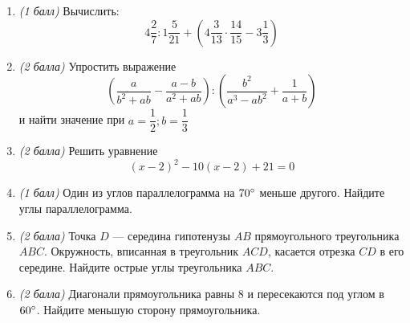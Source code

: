 \documentclass[12pt, a4paper]{article}
\begin{document}
		

\begin{enumerate}
	\item \textit{(1 балл)} Вычислить: $$4\dfrac{2}{7}:1\dfrac{5}{21}+\left(4\dfrac{3}{13}\cdot\dfrac{14}{15}-3\dfrac{1}{3}\right)$$
	\item \textit{(2 балла)} Упростить выражение $$\left(\dfrac{a}{b^2+ab}-\dfrac{a-b}{a^2+ab}\right):\left(\dfrac{b^2}{a^3-ab^2}+\dfrac{1}{a+b}\right)$$
	и найти значение при $a=\dfrac{1}{2}; b=\dfrac{1}{3}$
	\item \textit{(2 балла)} Решить уравнение $$(x-2)^2-10(x-2)+21=0$$
	\item \textit{(1 балл)} Один из углов параллелограмма на $70\degree$ меньше другого. Найдите углы параллелограмма.
	\item \textit{(2 балла)} Точка $D$ — середина гипотенузы $AB$ прямоугольного треугольника $ABC$. Окружность, вписанная в треугольник
	$ACD$, касается отрезка $CD$ в его середине. Найдите острые углы треугольника $ABC$.
	\item \textit{(2 балла)} Диагонали прямоугольника равны $8$ и пересекаются под углом в $60\degree$. Найдите меньшую сторону прямоугольника.
\end{enumerate}
\end{document}
